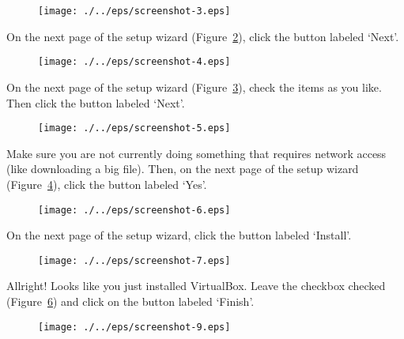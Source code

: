 \begin{figure}[ht]
  \centering
    \texttt{[image: ./../eps/screenshot-3.eps]}
  \caption{}
  \label{fig:screenshot-3}
\end{figure}


On the next page of the setup wizard (Figure~\ref{fig:screenshot-4}), click the button labeled `Next'.

\begin{figure}[ht]
  \centering
    \texttt{[image: ./../eps/screenshot-4.eps]}
  \caption{}
  \label{fig:screenshot-4}
\end{figure}
\clearpage

On the next page of the setup wizard (Figure~\ref{fig:screenshot-5}), check the items as you like. Then click the button labeled `Next'.

\begin{figure}[ht]
  \centering
    \texttt{[image: ./../eps/screenshot-5.eps]}
  \caption{}
  \label{fig:screenshot-5}
\end{figure}


Make sure you are not currently doing something that requires network access (like downloading a big file). Then, on the next page of the setup wizard (Figure~\ref{fig:screenshot-6}), click the button labeled `Yes'.

\begin{figure}[ht]
  \centering
    \texttt{[image: ./../eps/screenshot-6.eps]}
  \caption{}
  \label{fig:screenshot-6}
\end{figure}
\clearpage

On the next page of the setup wizard, click the button labeled `Install'.

\begin{figure}[ht]
  \centering
    \texttt{[image: ./../eps/screenshot-7.eps]}
  \caption{}
  \label{fig:screenshot-7}
\end{figure}




Allright! Looks like you just installed VirtualBox. Leave the checkbox checked (Figure~\ref{fig:screenshot-9}) and click on the button labeled `Finish'.
\begin{figure}[ht]
  \centering
    \texttt{[image: ./../eps/screenshot-9.eps]}
  \caption{}
  \label{fig:screenshot-9}
\end{figure}
\clearpage


